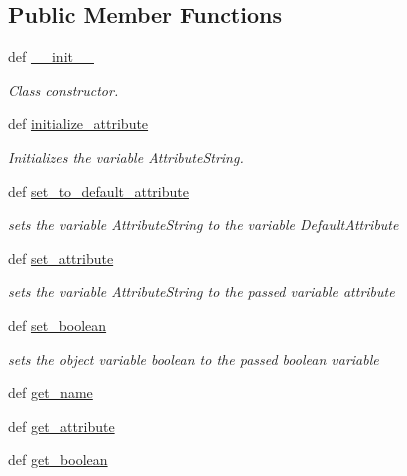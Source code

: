\subsection*{Public Member Functions}
\begin{DoxyCompactItemize}
\item 
def \hyperlink{classattributes_1_1_attribute_afe761453b838f336a71de981967a1196}{\-\_\-\-\_\-init\-\_\-\-\_\-}
\begin{DoxyCompactList}\small\item\em Class constructor. \end{DoxyCompactList}\item 
def \hyperlink{classattributes_1_1_attribute_a78546761ea790b58b9bf3746e38a59ae}{initialize\-\_\-attribute}
\begin{DoxyCompactList}\small\item\em Initializes the variable Attribute\-String. \end{DoxyCompactList}\item 
def \hyperlink{classattributes_1_1_attribute_aad32ba32a123223d68222083443df8ff}{set\-\_\-to\-\_\-default\-\_\-attribute}
\begin{DoxyCompactList}\small\item\em sets the variable Attribute\-String to the variable Default\-Attribute \end{DoxyCompactList}\item 
def \hyperlink{classattributes_1_1_attribute_a49ed6d4ece850ee63616ecddb95f7e34}{set\-\_\-attribute}
\begin{DoxyCompactList}\small\item\em sets the variable Attribute\-String to the passed variable attribute \end{DoxyCompactList}\item 
def \hyperlink{classattributes_1_1_attribute_a0ec4eaea8ac789e42e83a65a24d82752}{set\-\_\-boolean}
\begin{DoxyCompactList}\small\item\em sets the object variable boolean to the passed boolean variable \end{DoxyCompactList}\item 
def \hyperlink{classattributes_1_1_attribute_a5897c5790735326e884f656152b598d9}{get\-\_\-name}
\item 
def \hyperlink{classattributes_1_1_attribute_a1ce4013ad2db9bde281140d35306b656}{get\-\_\-attribute}
\item 
def \hyperlink{classattributes_1_1_attribute_a3ff8dacaff71408ae6991458b38255c8}{get\-\_\-boolean}
\end{DoxyCompactItemize}
